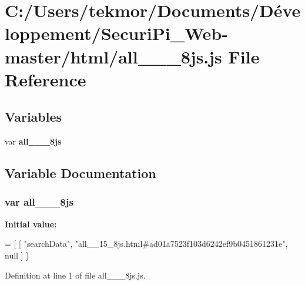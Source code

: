 \section{C\+:/\+Users/tekmor/\+Documents/\+Développement/\+Securi\+Pi\+\_\+\+Web-\/master/html/all\+\_\+\+\_\+\_\+8js.js File Reference}
\label{all____15__8js_8js}
\subsection*{Variables}
\begin{DoxyCompactItemize}
\item 
var {\bf all\+\_\+\+\_\+\_\+8js}
\end{DoxyCompactItemize}


\subsection{Variable Documentation}
\subsubsection[{all\+\_\+\+\_\+15\+\_\+8js}]{\setlength{\rightskip}{0pt plus 5cm}var all\+\_\+\+\_\+\_\+8js}\label{all____15__8js_8js_ab2f7ae2432a2df920b1ef16460478b66}
{\bfseries Initial value\+:}
\begin{DoxyCode}
=
[
    [ \textcolor{stringliteral}{"searchData"}, \textcolor{stringliteral}{"all\_\_15\_8js.html#ad01a7523f103d6242ef9b0451861231e"}, null ]
]
\end{DoxyCode}


Definition at line 1 of file all\+\_\+\+\_\+\_\+8js.\+js.

